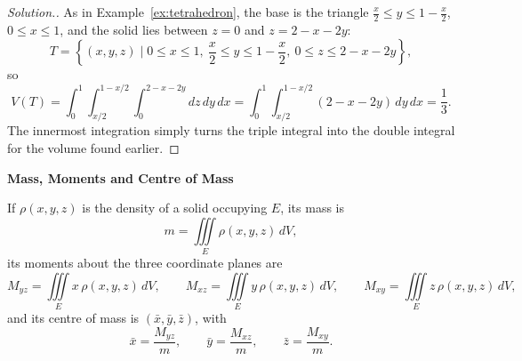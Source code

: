 \documentclass[11pt,a4paper]{article}
\theoremstyle{definition}
\newenvironment{solution}
  {\renewcommand{\qedsymbol}{}\begin{proof}[\textit{Solution}.]}
  {\end{proof}}
\newcommand{\subhead}[1]{%
  \par\medskip\noindent\textbf{#1}\par\nobreak\smallskip}
\begin{document}
\begin{solution}
As in Example~\ref{ex:tetrahedron}, the base is the triangle
$\frac{x}{2}\leq y\leq 1 - \frac{x}{2}$, $0\leq x\leq 1$, and the solid lies
between $z = 0$ and $z = 2 - x - 2y$:
\[T =\left\{ (x,y,z) \mid 0 \leq x \leq 1,\ \frac{x}{2}\leq y \leq 1 -
\frac{x}{2},\ 0 \leq z \leq 2 - x - 2y\right\} ,\]
so
\[V(T) = \int^1_0\int^{1-x/2}_{x/2} \int_0^{2-x-2y} dz\,dy\,dx = \int^1_0\int^{1-
x/2}_{x/2}(2 - x - 2y)\,dy\,dx = \frac{1}{3} .\]
The innermost integration simply turns the triple integral into the double
integral for the volume found earlier.
\end{solution}

\subhead{Mass, Moments and Centre of Mass}

If $\rho(x,y,z)$ is the density of a solid occupying $E$, its mass is
\[m = \iiint\limits_E \rho(x,y,z)\,dV ,\]
its moments about the three coordinate planes are
\[M_{yz} = \iiint\limits_E x\, \rho (x,y,z)\,dV ,\qquad M_{xz} = \iiint\limits_E
y\, \rho (x,y,z)\,dV ,\qquad M_{xy} = \iiint\limits_E z\, \rho (x,y,z)\,dV ,\]
and its centre of mass is $(\bar x,\bar y,\bar z)$, with
\[\bar x = \frac{M_{yz}}{m} ,\qquad \bar y = \frac{M_{xz}}{m} ,\qquad \bar z =
\frac{M_{xy}}{m} .\]
\end{document}

